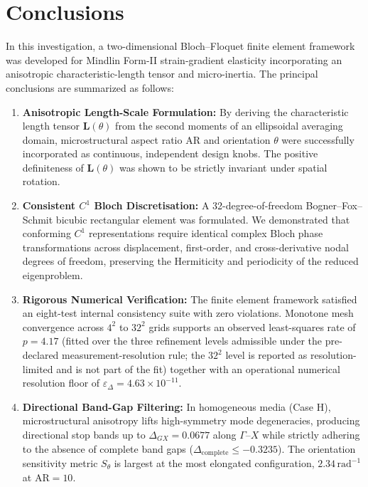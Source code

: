 \section{Conclusions}
\label{sec:conclusions}

In this investigation, a two-dimensional Bloch--Floquet finite element framework was developed for Mindlin Form-II strain-gradient elasticity incorporating an anisotropic characteristic-length tensor and micro-inertia. The principal conclusions are summarized as follows:
\begin{enumerate}
  \item \textbf{Anisotropic Length-Scale Formulation:} By deriving the characteristic length tensor $\mathbf{L}(\theta)$ from the second moments of an ellipsoidal averaging domain, microstructural aspect ratio $\mathrm{AR}$ and orientation $\theta$ were successfully incorporated as continuous, independent design knobs. The positive definiteness of $\mathbf{L}(\theta)$ was shown to be strictly invariant under spatial rotation.
  \item \textbf{Consistent $C^1$ Bloch Discretisation:} A 32-degree-of-freedom Bogner--Fox--Schmit bicubic rectangular element was formulated. We demonstrated that conforming $C^1$ representations require identical complex Bloch phase transformations across displacement, first-order, and cross-derivative nodal degrees of freedom, preserving the Hermiticity and periodicity of the reduced eigenproblem.
  \item \textbf{Rigorous Numerical Verification:} The finite element framework satisfied an eight-test internal consistency suite with zero violations. Monotone mesh convergence across $4^2$ to $32^2$ grids supports an observed least-squares rate of $p = 4.17$ (fitted over the three refinement levels admissible under the pre-declared measurement-resolution rule; the $32^2$ level is reported as resolution-limited and is not part of the fit) together with an operational numerical resolution floor of $\varepsilon_\Delta = 4.63 \times 10^{-11}$.
  \item \textbf{Directional Band-Gap Filtering:} In homogeneous media (Case H), microstructural anisotropy lifts high-symmetry mode degeneracies, producing directional stop bands up to $\Delta_{GX} = 0.0677$ along $\Gamma$--$X$ while strictly adhering to the absence of complete band gaps ($\Delta_{\mathrm{complete}} \le -0.3235$). The orientation sensitivity metric $S_\theta$ is largest at the most elongated configuration, $2.34\,\mathrm{rad}^{-1}$ at $\mathrm{AR} = 10$.

\end{enumerate}
